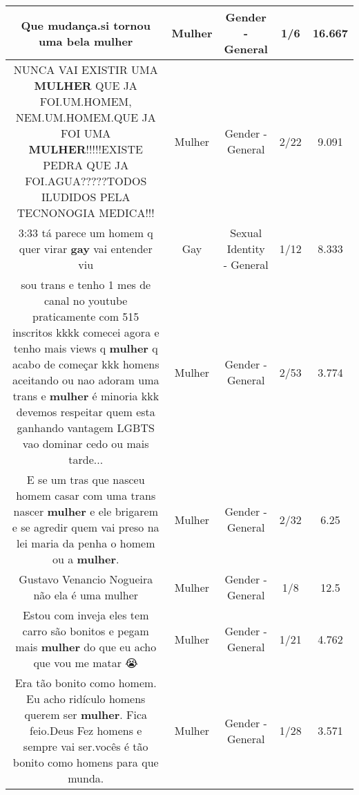 \documentclass[11pt]{article}
\newlength\mylength
\begin{document}
\begin{center}
\begin{longtable}{|C{.65\mylength}|C{.30\mylength}|C{.12\mylength}|C{.12\mylength}|C{.12\mylength}|}
  \small Que mudança.si tornou uma bela mulher\normalsize   & Mulher & Gender - General & 1/6 & 16.667 \\  \hline
  \small NUNCA VAI EXISTIR UMA \textbf{MULHER} QUE JA FOI.UM.HOMEM, NEM.UM.HOMEM.QUE JA FOI UMA \textbf{MULHER}!!!!!EXISTE PEDRA QUE JA FOI.AGUA?????TODOS ILUDIDOS PELA TECNONOGIA MEDICA!!!\normalsize   & Mulher & Gender - General & 2/22 & 9.091 \\  \hline
  \small 3:33 tá parece um homem q quer virar \textbf{gay} vai entender viu\normalsize   & Gay & Sexual Identity - General & 1/12 & 8.333 \\  \hline
  \small sou trans e tenho 1 mes de canal no youtube praticamente com 515 inscritos kkkk comecei agora e tenho mais views q \textbf{mulher} q acabo de começar kkk homens aceitando ou nao adoram uma trans e \textbf{mulher} é minoria kkk devemos respeitar quem esta ganhando vantagem LGBTS vao dominar cedo ou mais tarde...\normalsize   & Mulher & Gender - General & 2/53 & 3.774 \\  \hline
  \small E se um tras que nasceu homem casar com uma trans nascer \textbf{mulher} e ele brigarem e se agredir quem vai preso na lei maria da penha o homem ou a \textbf{mulher}.\normalsize   & Mulher & Gender - General & 2/32 & 6.25 \\  \hline
  \small Gustavo Venancio Nogueira não ela é uma mulher\normalsize   & Mulher & Gender - General & 1/8 & 12.5 \\  \hline
  \small Estou com inveja eles tem carro são bonitos e pegam mais \textbf{mulher} do que eu acho que vou me matar 😭\normalsize   & Mulher & Gender - General & 1/21 & 4.762 \\  \hline
  \small Era tão bonito como homem. Eu acho ridículo homens querem ser \textbf{mulher}. Fica feio.Deus Fez homens e sempre vai ser.vocês é tão bonito como homens para que munda.\normalsize   & Mulher & Gender - General & 1/28 & 3.571 \\  \hline

\end{longtable}
\end{center}
\end{document}
